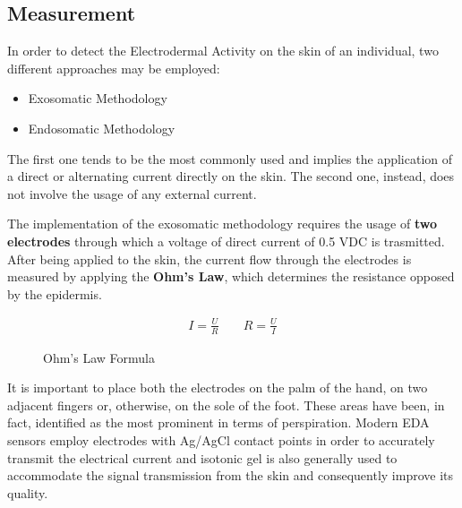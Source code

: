 \subsection{Measurement}\label{subsec:eda-measurement}


In order to detect the Electrodermal Activity on the skin of an individual, two different approaches may be employed:

\begin{itemize}
    \item Exosomatic Methodology
    \item Endosomatic Methodology
\end{itemize}

The first one tends to be the most commonly used and implies the application of a direct or alternating current directly on the skin. The second one, instead, does not involve the usage of any external current.

The implementation of the exosomatic methodology requires the usage of \textbf{two electrodes} through which a voltage of direct current of 0.5 VDC is trasmitted. After being applied to the skin, the current flow through the electrodes is measured by applying the \textbf{Ohm's Law}, which determines the resistance opposed by the epidermis.

\begin{figure}[h]
    \begin{equation}
    \begin{aligned}
    I = \frac{U}{R} \; \; \; \; \; \; \; R = \frac{U}{I}
    \end{aligned}
    \end{equation}
    \caption{Ohm's Law Formula}
    \label{fig:ohmlaw}
\end{figure}

It is important to place both the electrodes on the palm of the hand, on two adjacent fingers or, otherwise, on the sole of the foot. These areas have been, in fact, identified as the most prominent in terms of perspiration. Modern EDA sensors employ electrodes with Ag/AgCl contact points in order to accurately transmit the electrical current \cite{eda-imotions} and isotonic gel is also generally used to accommodate the signal transmission from the skin and consequently improve its quality.

